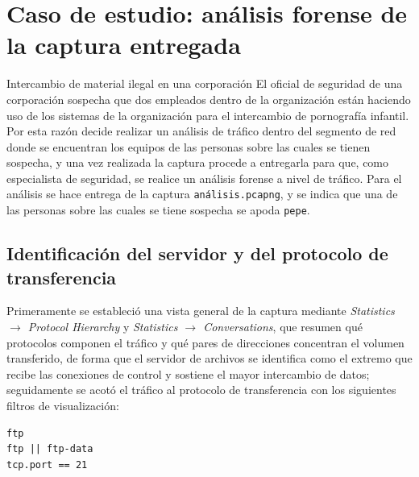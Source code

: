 \section{Caso de estudio: análisis forense de la captura entregada}

\begin{caso}{Intercambio de material ilegal en una corporación}
El oficial de seguridad de una corporación sospecha que dos empleados dentro de la organización están haciendo uso de los sistemas de la organización para el intercambio de pornografía infantil. Por esta razón decide realizar un análisis de tráfico dentro del segmento de red donde se encuentran los equipos de las personas sobre las cuales se tienen sospecha, y una vez realizada la captura procede a entregarla para que, como especialista de seguridad, se realice un análisis forense a nivel de tráfico. Para el análisis se hace entrega de la captura \texttt{análisis.pcapng}, y se indica que una de las personas sobre las cuales se tiene sospecha se apoda \texttt{pepe}.
\end{caso}


\subsection{Identificación del servidor y del protocolo de transferencia}

Primeramente se estableció una vista general de la captura mediante \emph{Statistics $\rightarrow$ Protocol Hierarchy} y \emph{Statistics $\rightarrow$ Conversations}, que resumen qué protocolos componen el tráfico y qué pares de direcciones concentran el volumen transferido, de forma que el servidor de archivos se identifica como el extremo que recibe las conexiones de control y sostiene el mayor intercambio de datos; seguidamente se acotó el tráfico al protocolo de transferencia con los siguientes filtros de visualización:

\begin{lstlisting}
ftp
ftp || ftp-data
tcp.port == 21
\end{lstlisting}

